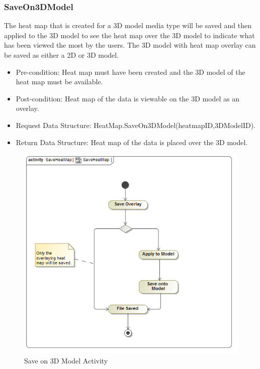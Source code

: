 	\subsubsection{SaveOn3DModel}
	The heat map that is created for a 3D model media type will be saved and then applied to the 3D model to see the heat map over the 3D model to indicate what has been viewed the most by the users. The 3D model with heat map overlay can be saved as either a 2D or 3D model.
	\begin{itemize}
		\item Pre-condition: Heat map must have been created and the 3D model of the heat map must be available.
		\item Post-condition: Heat map of the data is viewable on the 3D model as an overlay.
		\item Request Data Structure: HeatMap.SaveOn3DModel(heatmapID,3DModelID).
		\item Return Data Structure: Heat map of the data is placed over the 3D model.
	\end{itemize}
	\begin{figure}[!ht]
		\centering	
		\includegraphics[scale=0.5]{Diagrams/Activity_Diagram__SaveHeatMap__SaveHeatMap.png}	
		\caption{Save on 3D Model Activity}
	\end{figure}
		
